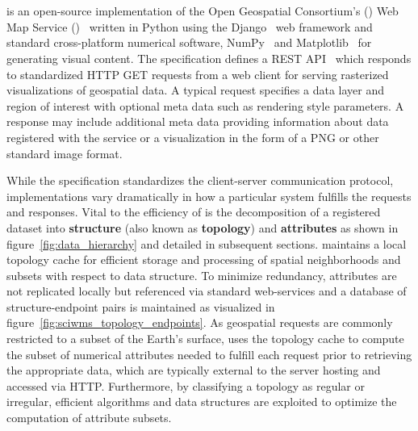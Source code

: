 \section{\sciwms{}}
\label{sec:sciwms}
\Sciwms{} is an open-source implementation of the Open Geospatial
Consortium's (\ogc{}) Web Map Service (\wms{})~\cite{wms14} written in
Python using the Django~\cite{django} web framework and standard
cross-platform numerical software, NumPy~\cite{numpy11} and
Matplotlib~\cite{hunter07} for generating visual content. The \wms{}
specification defines a REST API~\cite{Fielding02} which responds to
standardized HTTP GET requests from a web client for serving
rasterized visualizations of geospatial data. A typical \wms{} request
specifies a data layer and region of interest with optional meta data
such as rendering style parameters. A \wms{} response may include
additional meta data providing information about data registered with
the service or a visualization in the form of a PNG or other standard
image format.

While the \ogc{} \wms{} specification standardizes the client-server
communication protocol, \wms{} implementations vary dramatically in
how a particular system fulfills the \wms{} requests and
responses. Vital to the efficiency of \sciwms{} is the decomposition
of a registered dataset into \textbf{structure} (also known as
\textbf{topology}) and \textbf{attributes} as shown in
figure~\ref{fig:data_hierarchy} and detailed in subsequent
sections. \Sciwms{} maintains a local topology cache for efficient
storage and processing of spatial neighborhoods and subsets with
respect to data structure. To minimize redundancy, attributes are not
replicated locally but referenced via standard web-services and a
database of structure-endpoint pairs is maintained as visualized in
figure~\ref{fig:sciwms_topology_endpoints}. As geospatial \wms{}
requests are commonly restricted to a subset of the Earth's surface,
\sciwms{} uses the topology cache to compute the subset of numerical
attributes needed to fulfill each request prior to retrieving the
appropriate data, which are typically external to the server hosting
\sciwms{} and accessed via HTTP. Furthermore, by classifying a
topology as regular or irregular, efficient algorithms and data
structures are exploited to optimize the computation of attribute
subsets.
